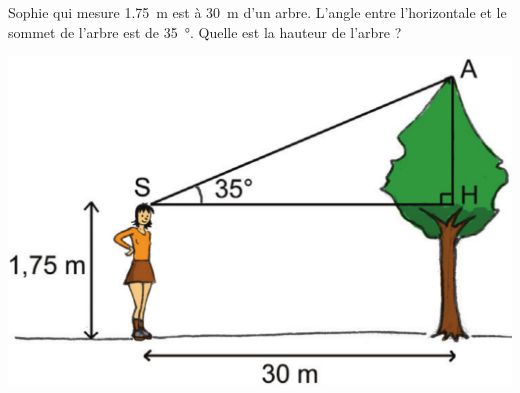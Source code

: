 
\begin{exercice}\label{exo2smath-0149}

    \begin{multicols}{2}

    Sophie qui mesure \SI{1.75}{\meter} est à \SI{30}{\meter} d'un arbre. L'angle entre l'horizontale et le sommet de l'arbre est de \SI{35}{\degree}. Quelle est la hauteur de l'arbre ?

    \columnbreak

\includegraphics[width=\linewidth]{arbrecosinus.pdf}

    \end{multicols}

\end{exercice}
